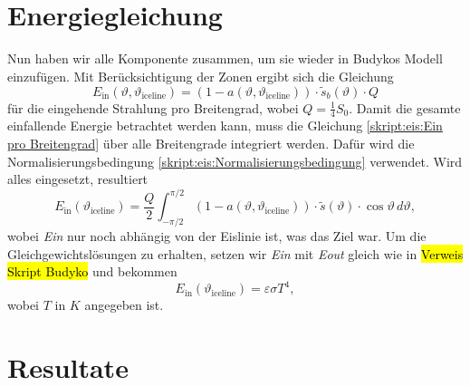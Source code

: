 \begin{refsection}
\section{Energiegleichung}
Nun haben wir alle Komponente zusammen, um sie wieder in Budykos Modell einzufügen. Mit Berücksichtigung der Zonen ergibt sich die Gleichung
\begin{equation}\label{skript:eis:Ein pro Breitengrad}
E_\text{in}(\vartheta,\vartheta_\text{iceline})
=
(1-a(\vartheta,\vartheta_\text{iceline}))\cdot\tilde{s}_{b}(\vartheta)\cdot Q
\end{equation}
für die eingehende Strahlung pro Breitengrad, wobei $Q=\tfrac{1}{4}S_{0}$. Damit die gesamte einfallende Energie betrachtet werden kann, muss die Gleichung \eqref{skript:eis:Ein pro Breitengrad} über alle Breitengrade integriert werden. Dafür wird die Normalisierungsbedingung \eqref{skript:eis:Normalisierungsbedingung} verwendet. Wird alles eingesetzt, resultiert
\begin{equation}\label{skript:eis:Ein abh ice line}
E_\text{in}(\vartheta_\text{iceline})
=
\frac{Q}{2}\int_{-\pi/2}^{\pi/2}(1-a(\vartheta,\vartheta_\text{iceline}))\cdot\tilde{s}(\vartheta)\cdot\cos\vartheta\,d\vartheta,
\end{equation}
wobei {\em Ein} nur noch abhängig von der Eislinie ist, was das Ziel war.
Um die Gleichgewichtslösungen zu erhalten, setzen wir {\em Ein} mit {\em Eout} gleich wie in \hl{Verweis Skript Budyko} und bekommen
\begin{equation}\label{skript:eis:Gleichgewichtsgleichung}
	E_\text{in}(\vartheta_\text{iceline})
	=
	\varepsilon\sigma T^4,
\end{equation}
wobei $T$ in $K$ angegeben ist.
\section{Resultate} \label{skript:eis:Resultate}

\end{refsection}
